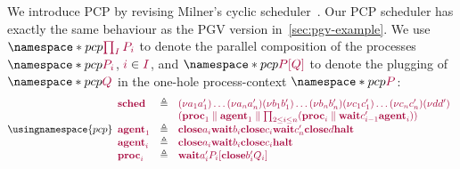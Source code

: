 \documentclass[main.tex]{subfiles}
\begin{document}
\begin{example}\label{sec:pcp-example}
We introduce PCP by revising Milner's cyclic scheduler~\cite{milner89,dardhagay18}. Our PCP scheduler has exactly the same behaviour as the PGV version in~\cref{sec:pgv-example}. We use $\pcp{\tm{\prod_{I}P_i}}$ to denote the parallel composition of the processes $\pcp{\tm{P_i}}$, $\tm{i}\in\tm{I}$, and $\pcp{\tm{\plug{P}{Q}}}$ to denote the plugging of $\pcp{\tm{Q}}$ in the one-hole process-context $\pcp{\tm{P}}$:
\[
  \usingnamespace{pcp}
  \begin{array}{lrlr}
    \tm{\sched}
    & \defeq & \tm{\res{a_1}{a'_1}{\dots{\res{a_n}{a'_n}{}}}}
               \tm{\res{b_1}{b'_1}{\dots{\res{b_n}{b'_n}{}}}}
               \tm{\res{c_1}{c'_1}{\dots{\res{c_n}{c'_n}{}}}}
               \tm{\res{d}{d'}{}}
    \\ &     & \tm{(
               \ppar{\proc1}{\agent1}
               \parallel
               \prod_{2\leq{i}\leq{n}}(\ppar{\proc{i}}{\wait{c'_{i-1}}{\agent{i}}})
               )}
    \\
    \tm{\agent1}
    & \defeq & \tm{\close{a_i}{\wait{b_i}{\close{c_i}{\wait{c'_n}{\close{d}{\halt}}}}}}
    \\
    \tm{\agent{i}}
    & \defeq & \tm{\close{a_i}{\wait{b_i}{\close{c_i}{\halt}}}}
    \\
    \tm{\proc{i}}
    & \defeq & \tm{\wait{a'_i}{\plug{P_i}{\close{b'_i}{Q_i}}}}
  \end{array}
\]
\end{example}
\end{document}

